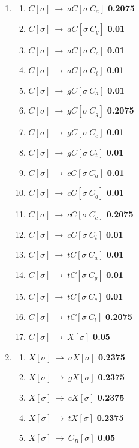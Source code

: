 \documentclass[11pt]{article}
\begin{document}
\begin{enumerate}
\item 
  \begin{enumerate}
    \item $C[\sigma] \ \rightarrow \ a C[\sigma \ C_a]$ {\bf 0.2075}
    \item $C[\sigma] \ \rightarrow \ a C[\sigma \ C_g]$ {\bf 0.01}
    \item $C[\sigma] \ \rightarrow \ a C[\sigma \ C_c]$ {\bf 0.01}
    \item $C[\sigma] \ \rightarrow \ a C[\sigma \ C_t]$ {\bf 0.01}
    \item $C[\sigma] \ \rightarrow \ g C[\sigma \ C_a]$ {\bf 0.01}
    \item $C[\sigma] \ \rightarrow \ g C[\sigma \ C_g]$ {\bf 0.2075}
    \item $C[\sigma] \ \rightarrow \ g C[\sigma \ C_c]$ {\bf 0.01}
    \item $C[\sigma] \ \rightarrow \ g C[\sigma \ C_t]$ {\bf 0.01}
    \item $C[\sigma] \ \rightarrow \ c C[\sigma \ C_a]$ {\bf 0.01}
    \item $C[\sigma] \ \rightarrow \ c C[\sigma \ C_g]$ {\bf 0.01}
    \item $C[\sigma] \ \rightarrow \ c C[\sigma \ C_c]$ {\bf 0.2075}
    \item $C[\sigma] \ \rightarrow \ c C[\sigma \ C_t]$ {\bf 0.01}
    \item $C[\sigma] \ \rightarrow \ t C[\sigma \ C_a]$ {\bf 0.01}
    \item $C[\sigma] \ \rightarrow \ t C[\sigma \ C_g]$ {\bf 0.01}
    \item $C[\sigma] \ \rightarrow \ t C[\sigma \ C_c]$ {\bf 0.01}
    \item $C[\sigma] \ \rightarrow \ t C[\sigma \ C_t]$ {\bf 0.2075}
    \item $C[\sigma] \ \rightarrow \ X[\sigma]$ {\bf 0.05}
  \end{enumerate}
\item
  \begin{enumerate}
    \item $X[\sigma] \ \rightarrow \ a X[\sigma]$ {\bf 0.2375}
    \item $X[\sigma] \ \rightarrow \ g X[\sigma]$ {\bf 0.2375}
    \item $X[\sigma] \ \rightarrow \ c X[\sigma]$ {\bf 0.2375}
    \item $X[\sigma] \ \rightarrow \ t X[\sigma]$ {\bf 0.2375}
    \item $X[\sigma] \ \rightarrow \ C_R[\sigma]$ {\bf 0.05}

\end{enumerate}
\end{enumerate}
\end{document}
